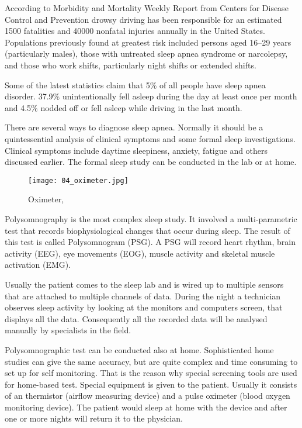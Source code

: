 According to Morbidity and Mortality Weekly Report from Centers for Disease Control and Prevention \cite{MMWR} drowsy driving has been responsible for an estimated 1500 fatalities and 40000 nonfatal injuries annually in the United States. Populations previously found at greatest risk included persons aged 16--29 years (particularly males), those with untreated sleep apnea syndrome or narcolepsy, and those who work shifts, particularly night shifts or extended shifts.

Some of the latest statistics \cite{statistics} claim that 5\% of all people have sleep apnea disorder. 37.9\% unintentionally fell asleep during the day at least once per month and 4.5\% nodded off or fell asleep while driving in the last month.

There are several ways to diagnose sleep apnea. Normally it should be a quintessential analysis of clinical symptoms and some formal sleep investigations. Clinical symptoms include daytime sleepiness, anxiety, fatigue and others discussed earlier. The formal sleep study can be conducted in the lab or at home. 

\begin{figure}[!ht]
\centering
\texttt{[image: 04\_oximeter.jpg]}
\caption{Oximeter, \cite{oximeter}}
\label{fig:oximeter}
\end{figure}

Polysomnography is the most complex sleep study. It involved a multi-parametric test that records biophysiological changes that occur during sleep. The result of this test is called Polysomnogram (PSG). A PSG will record heart rhythm, brain activity (EEG), eye movements (EOG), muscle activity and skeletal muscle activation (EMG). 

Usually the patient comes to the sleep lab and is wired up to multiple sensors that are attached to multiple channels of data. During the night a technician observes sleep activity by looking at the monitors and computers screen, that displays all the data. Consequently all the recorded data will be analysed manually by specialists in the field.

Polysomnographic test can be conducted also at home. Sophisticated home studies can give the same accuracy, but are quite complex and time consuming to set up for self monitoring. That is the reason why special screening tools are used for home-based test. Special equipment is given to the patient. Usually it consists of an thermistor (airflow measuring device) and a pulse oximeter (blood oxygen monitoring device). The patient would sleep at home with the device and after one or more nights will return it to the physician. 

